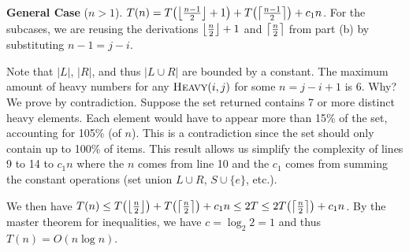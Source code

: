 \documentclass[12pt,a4paper]{article}
\begin{document}
\begin{enumerate}[label=(\alph*)]
		\textbf{General Case} ($n > 1$). $T(n) = T\parens*{\floor*{\frac{n-1}{2}} + 1} + T\parens*{\ceil*{\frac{n-1}{2}}} + c_1 n$. For the subcases, we are reusing the derivations $\floor*{\frac{n}{2}} + 1$ and $\ceil*{\frac{n}{2}}$ from part (b) by substituting $n - 1 = j - i$.

		Note that $|L|$, $|R|$, and thus $|L \cup R|$ are bounded by a constant. The maximum amount of heavy numbers for any $\textproc{Heavy}(i, j)$ for some $n = j - i + 1$ is 6. Why? We prove by contradiction. Suppose the set returned contains 7 or more distinct heavy elements. Each element would have to appear more than 15\% of the set, accounting for 105\% (of $n$). This is a contradiction since the set should only contain up to 100\% of items. This result allows us simplify the complexity of lines 9 to 14 to $c_1 n$ where the $n$ comes from line 10 and the $c_1$ comes from summing the constant operations (set union $L \cup R$, $S \cup \{e\}$, etc.).
		
		We then have $T(n) \le T\parens*{\floor*{\frac{n}{2}}} + T\parens*{\ceil*{\frac{n}{2}}} + c_1n \le 2T \le 2T\parens*{\ceil*{\frac{n}{2}}} + c_1n$. By the master theorem for inequalities, we have $c = \log_2 2 = 1$ and thus $T(n) = O(n \log n)$.
	\end{enumerate}
	 
\end{document}
